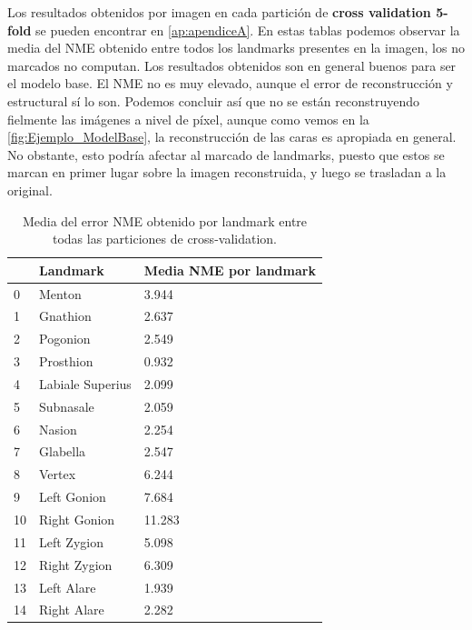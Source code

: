         \noindent Los resultados obtenidos por imagen en cada partición de \textbf{cross validation 5-fold } se pueden encontrar en \autoref{ap:apendiceA}. En estas tablas podemos observar la media del NME obtenido entre todos los landmarks presentes en la imagen, los no marcados no computan. Los resultados obtenidos son en general buenos para ser el modelo base. El NME no es muy elevado, aunque el error de reconstrucción y estructural sí lo son. Podemos concluir así que no se están reconstruyendo fielmente las imágenes a nivel de píxel, aunque como vemos en la \autoref{fig:Ejemplo_ModelBase}, la reconstrucción de las caras es apropiada en general. No obstante, esto podría afectar al marcado de landmarks, puesto que estos se marcan en primer lugar sobre la imagen reconstruida, y luego se trasladan a la original.

        \begin{table}[!ht]
            \centering
            \caption{Media del error NME obtenido por landmark entre todas las particiones de cross-validation.}
            \begin{tabular}{|l|l|l|}
            \hline
                ~ & \cellcolor{gray!25}\textbf{Landmark} & \cellcolor{gray!25}\textbf{Media NME por landmark} \\ \hline
                0 & Menton & 3.944 \\ \hline
                1 & Gnathion & 2.637 \\ \hline
                2 & Pogonion & 2.549 \\ \hline
                3 & Prosthion & 0.932 \\ \hline
                4 & Labiale Superius & 2.099 \\ \hline
                5 & Subnasale & 2.059 \\ \hline
                6 & Nasion & 2.254 \\ \hline
                7 & Glabella & 2.547 \\ \hline
                8 & Vertex & 6.244 \\ \hline
                9 & Left Gonion & 7.684 \\ \hline
                10 & Right Gonion & 11.283 \\ \hline
                11 & Left Zygion & 5.098 \\ \hline
                12 & Right Zygion & 6.309 \\ \hline
                13 & Left Alare & 1.939 \\ \hline
                14 & Right Alare & 2.282 \\ \hline

\end{tabular}
\end{table}
